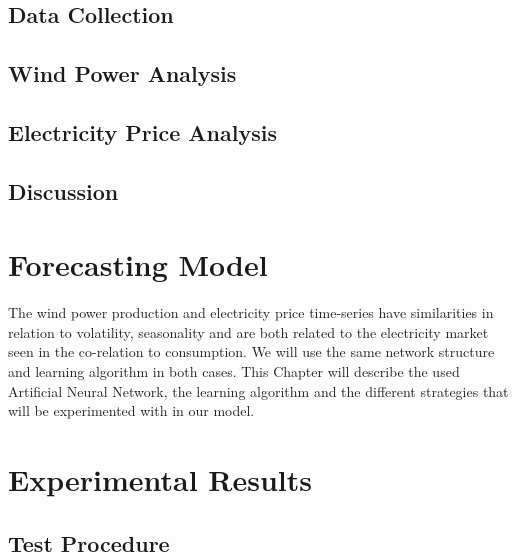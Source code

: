 \documentclass[twoside,11pt,openright]{report}
\begin{document}
\section{Data Collection}
\label{sec:dataCollection}

\newpage
\section{Wind Power Analysis}
\label{sec:windPowerAnalysis}

\newpage
\section{Electricity Price Analysis}
\label{sec:ElectricityPriceAnalysis}

\section{Discussion}



\chapter{Forecasting Model}
\label{ch:forecastingModel}
The wind power production and electricity price time-series have similarities in relation to volatility, seasonality and are both related to the electricity market seen in the co-relation to consumption. We will use the same network structure and learning algorithm in both cases. This Chapter will describe the used Artificial Neural Network, the learning algorithm and the different strategies that will be experimented with in our model.







\chapter{Experimental Results}
\label{ch:experimentalResults}
\section{Test Procedure}
\label{sec:testProcedure}

\end{document}
